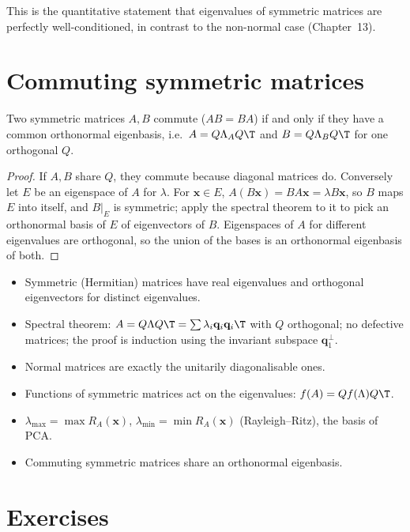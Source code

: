 This is the quantitative statement that eigenvalues of symmetric matrices are perfectly well-conditioned, in contrast to the non-normal case (Chapter~13).

\section{Commuting symmetric matrices}

\begin{theorem}\label{thm:simdiag}
Two symmetric matrices $A,B$ commute ($AB=BA$) if and only if they have a common orthonormal eigenbasis, i.e.\ $A=Q\Lambda_AQ\T$ and $B=Q\Lambda_BQ\T$ for one orthogonal $Q$.
\end{theorem}

\begin{proof}
If $A,B$ share $Q$, they commute because diagonal matrices do. Conversely let $E$ be an eigenspace of $A$ for $\lambda$. For $\mathbf{x}\in E$, $A(B\mathbf{x})=BA\mathbf{x}=\lambda B\mathbf{x}$, so $B$ maps $E$ into itself, and $B|_E$ is symmetric; apply the spectral theorem to it to pick an orthonormal basis of $E$ of eigenvectors of $B$. Eigenspaces of $A$ for different eigenvalues are orthogonal, so the union of the bases is an orthonormal eigenbasis of both.
\end{proof}

\begin{summarybox}
\begin{itemize}
  \item Symmetric (Hermitian) matrices have real eigenvalues and orthogonal eigenvectors for distinct eigenvalues.
  \item Spectral theorem: $A=Q\Lambda Q\T=\sum\lambda_i\mathbf{q}_i\mathbf{q}_i\T$ with $Q$ orthogonal; no defective matrices; the proof is induction using the invariant subspace $\mathbf{q}_1^\perp$.
  \item Normal matrices are exactly the unitarily diagonalisable ones.
  \item Functions of symmetric matrices act on the eigenvalues: $f(A)=Qf(\Lambda)Q\T$.
  \item $\lambda_{\max}=\max R_A(\mathbf{x})$, $\lambda_{\min}=\min R_A(\mathbf{x})$ (Rayleigh--Ritz), the basis of PCA.
  \item Commuting symmetric matrices share an orthonormal eigenbasis.
\end{itemize}
\end{summarybox}

\section{Exercises}

